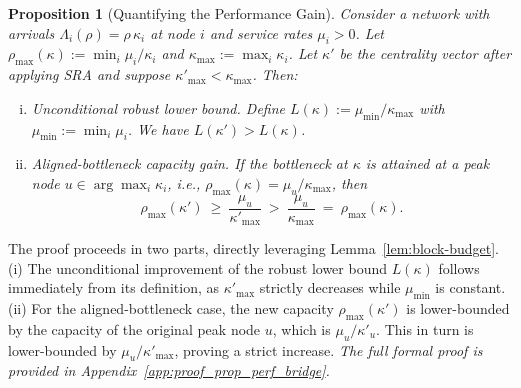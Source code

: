 \documentclass[journal]{IEEEtran}
\newtheorem{proposition}{Proposition}
\begin{document}
\begin{proposition}[Quantifying the Performance Gain]
\label{prop:perf-bridge}
Consider a network with arrivals $\Lambda_i(\rho)=\rho\,\kappa_i$ at node $i$ and service rates $\mu_i>0$.
Let $\rho_{\max}(\kappa):=\min_{i} \mu_i/\kappa_i$ and $\kappa_{\max}:=\max_{i} \kappa_i$.
Let $\kappa'$ be the centrality vector after applying SRA and suppose $\kappa'_{\max}<\kappa_{\max}$.
Then:
\begin{enumerate}[(i)]
\item \emph{Unconditional robust lower bound.} 
Define $L(\kappa):=\mu_{\min}/\kappa_{\max}$ with $\mu_{\min}:=\min_i \mu_i$.
We have $L(\kappa')>L(\kappa)$.
\item \emph{Aligned-bottleneck capacity gain.}
If the bottleneck at $\kappa$ is attained at a peak node $u\in\arg\max_i \kappa_i$, i.e.,
$\rho_{\max}(\kappa)=\mu_u/\kappa_{\max}$, then
\begin{equation}
\rho_{\max}(\kappa')\ \ge\ \frac{\mu_u}{\kappa'_{\max}}\ >\ \frac{\mu_u}{\kappa_{\max}}\ =\ \rho_{\max}(\kappa).
\end{equation}
\end{enumerate}
\end{proposition}
\begin{IEEEproof}
The proof proceeds in two parts, directly leveraging Lemma~\ref{lem:block-budget}. (i) The unconditional improvement of the robust lower bound $L(\kappa)$ follows immediately from its definition, as $\kappa'_{\max}$ strictly decreases while $\mu_{\min}$ is constant. (ii) For the aligned-bottleneck case, the new capacity $\rho_{\max}(\kappa')$ is lower-bounded by the capacity of the original peak node $u$, which is $\mu_u/\kappa'_u$. This in turn is lower-bounded by $\mu_u/\kappa'_{\max}$, proving a strict increase.
\textit{The full formal proof is provided in Appendix~\ref{app:proof_prop_perf_bridge}.}
\end{IEEEproof}
\end{document}
